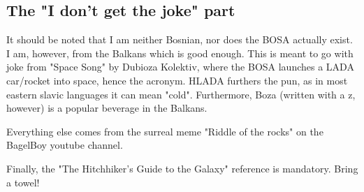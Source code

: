 \documentclass[10pt]{article}
\begin{document}
    \begin{appendices}
        \section{The "I don't get the joke" part}

            It should be noted that I am neither Bosnian, nor does the BOSA
            actually exist. I am, however, from the Balkans which is good enough.
            This is meant to go with joke from "Space Song" by Dubioza Kolektiv,
            where the BOSA launches a LADA car/rocket into space, hence the
            acronym. HLADA furthers the pun, as in most eastern slavic languages it
            can mean "cold". Furthermore, Boza (written with a z, however) is a
            popular beverage in the Balkans.

            Everything else comes from the surreal meme "Riddle of the rocks" on
            the BagelBoy youtube channel.

            Finally, the "The Hitchhiker's Guide to the Galaxy" reference is
            mandatory. Bring a towel!

    \end{appendices}
\end{document}
